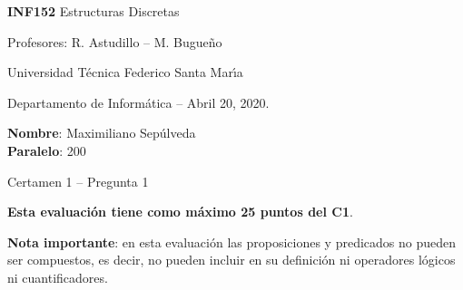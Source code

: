 \documentclass[legalpaper,10pt]{article}
\begin{document}
\thispagestyle{empty}

\begin{minipage}[t]{0.6\textwidth}

{\LARGE \textbf{INF152} Estructuras Discretas}

{\large Profesores: R. Astudillo -- M. Bugueño}

Universidad T\'ecnica Federico Santa Mar\'{\i}a

Departamento de Inform\'atica -- Abril 20, 2020.

\end{minipage}
\hfill
\begin{minipage}[t]{0.35\textwidth}
\textbf{Nombre}: Maximiliano Sepúlveda\\[0.3cm]
  \textbf{Paralelo}: 200
\end{minipage}

\vspace{0.8cm}

{\Large Certamen 1 -- Pregunta 1}

\vspace{0.4cm}

\textbf{Esta evaluación tiene como máximo 25 puntos del C1}.

\textbf{Nota importante}: en esta evaluación las proposiciones y predicados no pueden ser compuestos, es decir, no pueden incluir en su definición ni operadores lógicos ni cuantificadores.
\end{document}
